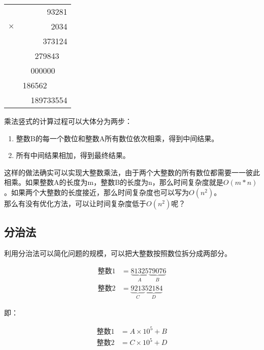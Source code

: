 \begin{table}[H]
    \centering
    \begin{tabular}{cD{.}{.}{3}}
                   & 93281           \\
        $ \times $ & 2034            \\
        \hline
                   & 373124          \\
                   & 279843\ \       \\
                   & 000000\ \ \     \\
                   & 186562\ \ \ \ \ \\
        \hline
                   & 189733554
    \end{tabular}
\end{table}

乘法竖式的计算过程可以大体分为两步：

\begin{enumerate}
    \item 整数B的每一个数位和整数A所有数位依次相乘，得到中间结果。
    \item 所有中间结果相加，得到最终结果。
\end{enumerate}

这样的做法确实可以实现大整数乘法，由于两个大整数的所有数位都需要一一彼此相乘。如果整数A的长度为m，整数B的长度为n，那么时间复杂度就是$ O(m * n) $。如果两个大整数的长度接近，那么时间复杂度也可以写为$ O(n^2) $。 \\

那么有没有优化方法，可以让时间复杂度低于$ O(n^2) $呢？ \\

\subsection{分治法}

利用分治法可以简化问题的规模，可以把大整数按照数位拆分成两部分。

\vspace{-1cm}

\begin{align*}
    \text{整数1} & = \underbrace{81325}_{A}\underbrace{79076}_{B} \\
    \text{整数2} & = \underbrace{9213}_{C}\underbrace{52184}_{D}
\end{align*}

即：

\vspace{-1cm}

\begin{align*}
    \text{整数1} & = A \times 10^5 + B \\
    \text{整数2} & = C \times 10^5 + D
\end{align*}

